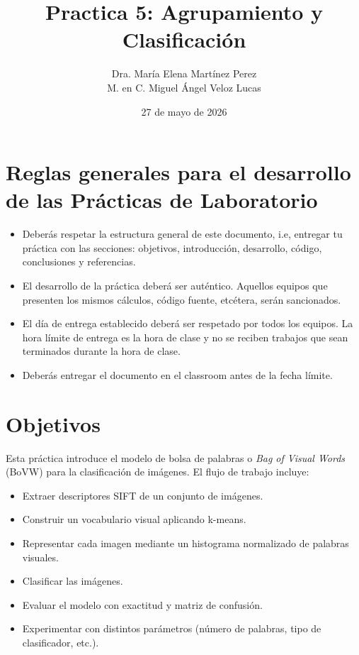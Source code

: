 \documentclass{article}
\title{Practica 5: Agrupamiento y Clasificación}
\author{Dra. María Elena Martínez Perez \\
M. en C. Miguel Ángel Veloz Lucas}
\date{27 de mayo de 2026}
\begin{document}
\maketitle
\section{Reglas generales para el desarrollo de las Prácticas de Laboratorio}

\begin{itemize}
\item Deberás respetar la estructura general de este documento, i.e, entregar tu práctica con las secciones: objetivos, introducción, desarrollo, código, conclusiones y referencias.
\item El desarrollo de la práctica deberá ser auténtico. Aquellos equipos que presenten los mismos cálculos, código fuente, etcétera, serán sancionados.
\item El día de entrega establecido deberá ser respetado por todos los equipos. La hora límite de entrega es la hora de clase y no se reciben trabajos que sean terminados durante la hora de clase.
\item  Deberás entregar el documento en el classroom antes de la fecha límite.
\end{itemize}

\section{Objetivos}

    Esta práctica introduce el modelo de bolsa de palabras o \textit{Bag of Visual Words} (BoVW) para la clasificación de imágenes. El flujo de trabajo incluye:
    \begin{itemize}        
    \item Extraer descriptores SIFT de un conjunto de imágenes.
    \item Construir un vocabulario visual aplicando k-means.
    \item Representar cada imagen mediante un histograma normalizado de palabras visuales.
    \item Clasificar las imágenes.
    \item Evaluar el modelo con exactitud y matriz de confusión.
    \item Experimentar con distintos parámetros (número de palabras, tipo de clasificador, etc.).      
 
    
\end{itemize}
\end{document}
